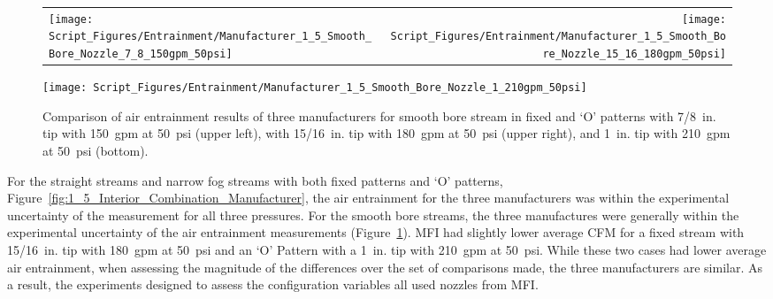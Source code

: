 \documentclass[12pt,oneside]{book}
\begin{document}
\begin{figure}[!ht]
\begin{tabular*}{\textwidth}{lr}
\texttt{[image: Script\_Figures/Entrainment/Manufacturer\_1\_5\_Smooth\_Bore\_Nozzle\_7\_8\_150gpm\_50psi]} &
\texttt{[image: Script\_Figures/Entrainment/Manufacturer\_1\_5\_Smooth\_Bore\_Nozzle\_15\_16\_180gpm\_50psi]} \\
\end{tabular*}
\centering
\texttt{[image: Script\_Figures/Entrainment/Manufacturer\_1\_5\_Smooth\_Bore\_Nozzle\_1\_210gpm\_50psi]} 
\caption[Average Air Entrainment Varying Manufacturer with Smooth Bore Nozzles]{Comparison of air entrainment results of three manufacturers for smooth bore stream in fixed and `O' patterns with 7/8~in. tip with 150~gpm at 50~psi (upper left), with 15/16~in. tip with 180~gpm at 50~psi (upper right), and 1~in. tip with 210~gpm at 50~psi (bottom).}
\label{fig:1_5_Interior_Smooth_Bore_Manufacturer}
\end{figure}

For the straight streams and narrow fog streams with both fixed patterns and `O' patterns, Figure~\ref{fig:1_5_Interior_Combination_Manufacturer}, the air entrainment for the three manufacturers was within the experimental uncertainty of the measurement for all three pressures. For the smooth bore streams, the three manufactures were generally within the experimental uncertainty of the air entrainment measurements (Figure~\ref{fig:1_5_Interior_Smooth_Bore_Manufacturer}). MFI had slightly lower average CFM for a fixed stream with 15/16~in. tip with 180~gpm at 50~psi and an `O' Pattern with a 1~in. tip with 210~gpm at 50~psi. While these two cases had lower average air entrainment, when assessing the magnitude of the differences over the set of comparisons made, the three manufacturers are similar. As a result, the experiments designed to assess the configuration variables all used nozzles from MFI. 
\clearpage



\end{document}
